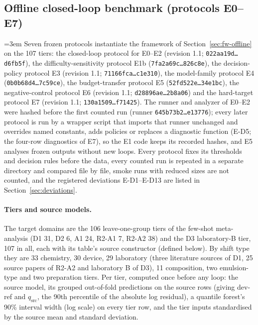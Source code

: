 \documentclass[11pt,a4paper]{article}
\newcommand{\hashtrunc}[2]{\texttt{#1\ldots#2}}
\begin{document}
\subsection{Offline closed-loop benchmark (protocols E0--E7)}
\label{sec:eloop}
\begingroup\emergencystretch=3em\relax
Seven frozen protocols instantiate the framework of Section~\ref{sec:fw-offline} on the
107 tiers: the closed-loop protocol for E0--E2 (revision 1.1; \hashtrunc{022aa19d}{d6fb5f}),
the difficulty-sensitivity protocol E1b (\hashtrunc{7fa2a69c}{826c8e}), the decision-policy
protocol E3 (revision 1.1; \hashtrunc{71166fca}{c1e310}), the model-family protocol E4
(\hashtrunc{0b0b68d4}{7c59ce}), the budget-transfer protocol E5 (\hashtrunc{52fd522e}{34e1bc}),
the negative-control protocol E6 (revision 1.1; \hashtrunc{d28896ae}{2b8a06}) and the
hard-target protocol E7 (revision 1.1; \hashtrunc{130a1509}{f71425}). The runner and analyzer of E0--E2 were
hashed before the first counted run (runner \hashtrunc{645b73b2}{e13776}); every later protocol is run by a
wrapper script that imports that runner unchanged and overrides named constants, adds policies or
replaces a diagnostic function (E-D5; the four-row diagnostics of E7), so the E1 code keeps its recorded hashes, and E5 analyses frozen outputs without new loops.
Every protocol fixes its thresholds and decision rules before the data, every counted run is
repeated in a separate directory and compared file by file, smoke runs with reduced sizes are not
counted, and the registered deviations E-D1--E-D13 are listed in Section~\ref{sec:deviations}.\par\endgroup

\paragraph{Tiers and source models.} The target domains are the 106 leave-one-group tiers of the
few-shot meta-analysis (D1 31, D2 6, A1 24, R2-A1 7,
R2-A2 38) and the D3 laboratory-B tier, 107 in all, each with its table's
source constructor (defined below). By shift type they are 33 chemistry, 30 device, 29 laboratory (three
literature sources of D1, 25 source papers of R2-A2 and laboratory B of D3), 11 composition, two
emulsion-type and two preparation tiers. Per tier, computed once before any loop: the source
model, its grouped out-of-fold predictions on the source rows (giving dev-ref and $q_{\mathrm{src}}$, the
90th percentile of the absolute log residual), a quantile forest's 90\% interval width (log scale) on every tier row,
and the tier inputs standardised by the source mean and standard deviation.
\end{document}
